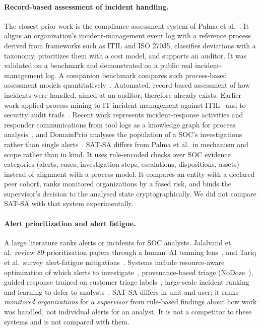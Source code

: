 \paragraph{Record-based assessment of incident handling.}
The closest prior work is the compliance assessment system of Palma et
al.~\cite{palma2024compliance}. It aligns an organization's incident-management
event log with a reference process derived from frameworks such as ITIL and ISO
27035, classifies deviations with a taxonomy, prioritizes them with a cost model,
and supports an auditor. It was validated on a benchmark and demonstrated on a public
real incident-management log. A companion benchmark compares such process-based
assessment models quantitatively~\cite{palma2024benchimp}. Automated, record-based
assessment of how incidents were handled, aimed at an auditor, therefore already
exists. Earlier work applied process mining to IT incident management against
ITIL~\cite{ferreira2008itil} and to security audit trails~\cite{vanderaalst2005security}.
Recent work represents incident-response activities and responder communications
from tool logs as a knowledge graph for process analysis~\cite{galadima2026irgraph},
and DomainPrio analyses the population of a SOC's investigations rather than single
alerts~\cite{chiba2022domainprio}. SAT-SA differs from Palma et al.\ in mechanism
and scope rather than in kind. It uses rule-encoded checks over SOC evidence
categories (alerts, cases, investigation steps, escalations, dispositions, assets)
instead of alignment with a process model. It compares an entity with a declared peer
cohort, ranks monitored organizations by a fused risk, and binds the supervisor's
decision to the analysed state cryptographically. We did not compare SAT-SA with
that system experimentally.

\paragraph{Alert prioritization and alert fatigue.}
A large literature ranks alerts or incidents for SOC analysts. Jalalvand et
al.\ review 89 prioritization papers through a human--AI teaming
lens~\cite{jalalvand2024prioritisation}, and Tariq et al.\ survey alert-fatigue
mitigations~\cite{tariq2025alertfatigue}. Systems include resource-aware
optimization of which alerts to investigate~\cite{shah2019alertselection},
provenance-based triage (NoDoze~\cite{hassan2019nodoze}), guided response trained on
customer triage labels~\cite{freitas2024guide}, large-scale incident
ranking~\cite{freitas2026aip} and learning to defer to analysts~\cite{jalalvand2025l2d}.
SAT-SA differs in unit and user: it ranks \emph{monitored organizations} for a
\emph{supervisor} from rule-based findings about how work was handled, not individual
alerts for an analyst. It is not a competitor to these systems and is not compared
with them.

